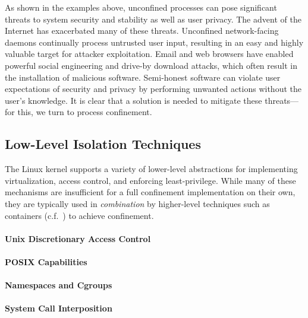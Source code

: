 \documentclass[dvipsnames, 12pt]{article}
\begin{document}
As shown in the examples above, unconfined processes can pose significant
threats to system security and stability as well as user privacy. The advent of
the Internet has exacerbated many of these threats. Unconfined network-facing
daemons continually process untrusted user input, resulting in an easy and
highly valuable target for attacker exploitation. Email and web browsers have
enabled powerful social engineering and drive-by download attacks, which often
result in the installation of malicious software. Semi-honest software can
violate user expectations of security and privacy by performing unwanted actions
without the user's knowledge. It is clear that a solution is needed to mitigate
these threats---for this, we turn to process confinement.

\subsection{Low-Level Isolation Techniques}
\label{subsection:low_level}

The Linux kernel supports a variety of lower-level abstractions for implementing
virtualization, access control, and enforcing least-privilege. While many of
these mechanisms are insufficient for a full confinement implementation on their
own, they are typically used in \textit{combination} by higher-level techniques
such as containers (c.f.~) to achieve confinement.

\paragraph*{Unix Discretionary Access Control}

\paragraph*{POSIX Capabilities}

\paragraph*{Namespaces and Cgroups}

\paragraph*{System Call Interposition}
\end{document}
